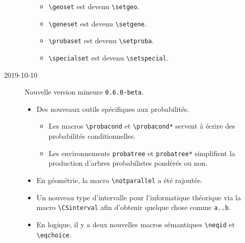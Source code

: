 \documentclass[12pt,a4paper]{article}
\newcommand\env[1]{\texttt{#1}}
\newcommand\macro[1]{\env{\textbackslash{}#1}}
\theoremstyle{definition}
\begin{document}
\begin{description}
\begin{itemize}[itemsep=.5em]
\begin{itemize}[itemsep=.5em]
            \item \macro{geoset} est devenu \macro{setgeo}.
    
            \item \macro{geneset} est devenu \macro{setgene}.
    
            \item \macro{probaset} est devenu \macro{setproba}.
    
            \item \macro{specialset} est devenu \macro{setspecial}.
        \end{itemize}
    \end{itemize}


    \medskip
    \item[2019-10-10] Nouvelle version mineure \verb+0.6.0-beta+.
    
    \begin{itemize}[itemsep=.5em]
        \item Des nouveaux outils spécifiques aux probabilités.
        \begin{itemize}[itemsep=.5em]
            \item Les macros \macro{probacond} et \macro{probacond*} servent à écrire des probabilités conditionnelles.
    
            \item Les environnements \verb+probatree+ et \verb+probatree*+ simplifient la production d'arbres probabilistes pondérés ou non.
        \end{itemize}
    
    
        \item En géométrie, la macro \macro{notparallel} a été rajoutée.
    
    
        \item Un nouveau type d'intervalle pour l'informatique théorique via la macro \macro{CSinterval} afin d'obtenir quelque chose comme \verb+a..b+.
    
    
        \item En logique, il y a deux nouvelles macros sémantiques \macro{neqid} et \macro{eqchoice}.
    \end{itemize}



\end{description}
\end{document}
